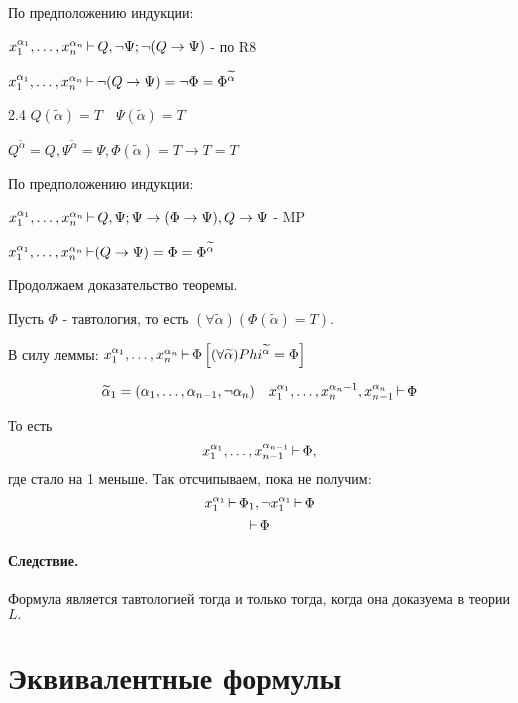 \begin{myproof}
\begin{myproof}
      По предположению индукции:

      $x_1^{\alpha_1},\ldots,x_{n}^{\alpha_n} \operatorname{\vdash} Q, \lnot \Psi; \lnot(Q \to \Psi)$ - по R8 

      $x_1^{\alpha_1},\ldots, x_{n}^{\alpha_n} \operatorname{\vdash} \lnot(Q \to \Psi) = \lnot \Phi
      = \Phi^{\widetilde{\alpha}}$

      \medskip

      2.4  $Q(\widetilde{\alpha}) = T \quad \Psi(\widetilde{\alpha}) = T$

      $Q^{\widetilde{\alpha}} = Q, \Psi^{\widetilde{\alpha}} = \Psi,
      \Phi(\widetilde{\alpha}) = T \to T = T$

      По предположению индукции:

      $x_1^{\alpha_1},\ldots,x_{n}^{\alpha_n} \operatorname{\vdash} Q, \Psi; \Psi \to (\Phi \to \Psi),
      Q \to \Psi$ - MP 

      $x_1^{\alpha_1},\ldots, x_{n}^{\alpha_n} \operatorname{\vdash} (Q \to \Psi) = \Phi
      = \Phi^{\widetilde{\alpha}}$
     
\end{myproof}

Продолжаем доказательство теоремы.

Пусть $\Phi$ - тавтология, то есть  $(\forall \widetilde{\alpha})(\Phi(\widetilde{\alpha}) = T)$.

В силу леммы: $x_1^{\alpha_1}, \ldots, x_{n}^{\alpha_n} \operatorname{\vdash} \Phi \left[ 
(\forall \widetilde{\alpha}) Phi^{\widetilde{\alpha}} = \Phi\right]$ 

$$\widetilde{\alpha}_1 = (\alpha_1,\ldots,\alpha_{n-1}, \lnot \alpha_n) \quad
x_1^{\alpha_1},\ldots,x_{n}^{\alpha_n-1}, x_{n-1}^{\alpha_n} \operatorname{\vdash} \Phi$$

То есть 
\[
x_1^{\alpha_1},\ldots,x_{n-1}^{\alpha_{n-1}} \operatorname{\vdash} \Phi,
\]
где стало на 1 меньше. Так отсчипываем, пока не получим:
\[
x_1^{\alpha_1} \operatorname{\vdash} \Phi_1, \lnot x_1^{\alpha_1} \operatorname{\vdash} \Phi
\]
\[
\operatorname{\vdash} \Phi
\] 

\end{myproof}

\paragraph*{Следствие.} Формула является тавтологией тогда и только тогда, когда она доказуема
в теории $L.$

\section{Эквивалентные формулы}

